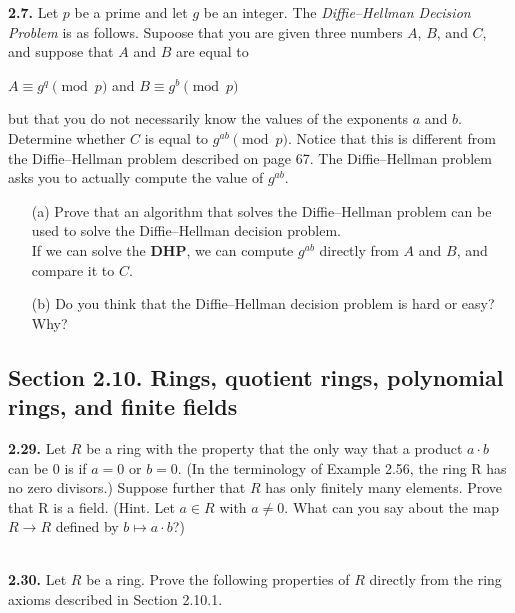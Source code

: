 \documentclass[11pt,fleqn]{article}
\begin{document}
\textbf{2.7.} Let $p$ be a prime and let $g$ be an integer. The \textit{Diffie–Hellman Decision Problem} is as follows. Supoose that you are given three numbers $A$, $B$, and $C$, and suppose that $A$ and $B$ are equal to
\begin{center}
$A \equiv g^q \pmod{p}$  and  $B \equiv g^b \pmod{p}$
\end{center}
but that you do not necessarily know the values of the exponents $a$ and $b$. Determine whether $C$ is equal to $g^{ab} \pmod{p}$. Notice that this is different from the Diffie–Hellman problem described on page 67. The Diffie–Hellman problem asks you to actually compute the value of $g^{ab}$. 
\begin{itemize}
\item[(a)] Prove that an algorithm that solves the Diffie–Hellman problem can be used to solve the Diffie–Hellman decision problem. \\
  If we can solve the \textbf{DHP}, we can compute $g^{ab}$ directly from $A$ and $B$, and compare it to $C$.  
\item[(b)] Do you think that the Diffie–Hellman decision problem is hard or easy? Why? \\
  
\end{itemize}


\subsection*{Section 2.10. Rings, quotient rings, polynomial rings, and finite fields}

\textbf{2.29.} Let $R$ be a ring with the property that the only way that a product $a \cdot b$ can be $0$ is if $a = 0$ or $b = 0$. (In the terminology of Example 2.56, the ring R has no zero divisors.) Suppose further that $R$ has only finitely many elements. Prove that R is a field. (Hint. Let $a \in R$ with $a \neq 0$. What can you say about the map $R \rightarrow R$ defined by $b \mapsto a \cdot b$?) \\
\\

\newpage
\begin{flushleft}
\textbf{2.30.} Let $R$ be a ring.  Prove the following properties of $R$ directly from the ring axioms described in Section 2.10.1.
\end{flushleft}
\end{document}

